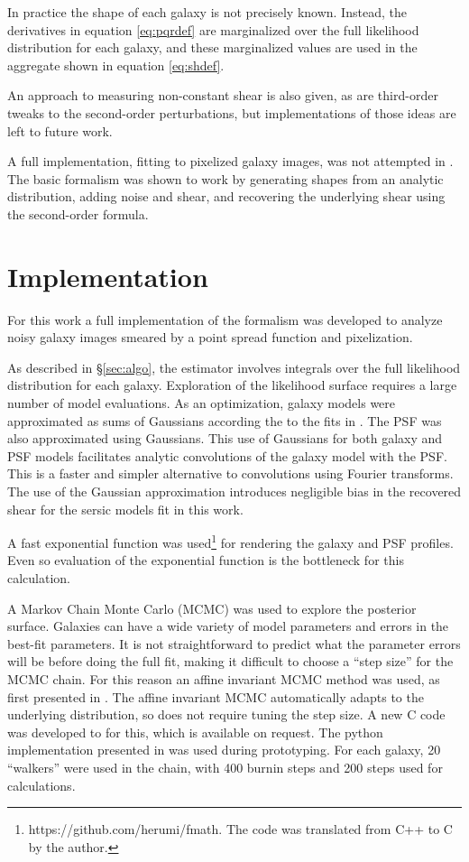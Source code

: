 \documentclass[12pt,preprint]{aastex}
\begin{document}
In practice the shape of each galaxy is not precisely known. Instead, the
derivatives in equation \ref{eq:pqrdef} are marginalized over the full
likelihood distribution for each galaxy, and these marginalized values are used
in the aggregate shown in equation \ref{eq:shdef}.  

An approach to measuring non-constant shear is also given, as are third-order
tweaks to the second-order perturbations, but implementations of those ideas
are left to future work.

A full implementation, fitting to pixelized galaxy images, was not attempted in
\citet{ba13}.  The basic formalism was shown to work by generating shapes from
an analytic distribution, adding noise and shear, and recovering the underlying
shear using the second-order formula.

\section{Implementation} \label{sec:impl}

For this work a full implementation of the \citet{ba13} formalism was developed
to analyze noisy galaxy images smeared by a point spread function and 
pixelization.

As described in \S \ref{sec:algo}, the estimator involves integrals over the
full likelihood distribution for each galaxy.  Exploration of the likelihood
surface requires a large number of model evaluations.  As an optimization,
galaxy models were approximated as sums of Gaussians according the to the fits
in \citet{HoggGMix12}.  The PSF was also approximated using Gaussians.  This
use of Gaussians for both galaxy and PSF models facilitates analytic
convolutions of the galaxy model with the PSF.  This is a faster and simpler
alternative to convolutions using Fourier transforms. The use of the
Gaussian approximation introduces negligible bias in the recovered shear for
the sersic models fit in this work.

A fast exponential function was used\footnote{https://github.com/herumi/fmath.
The code was translated from C++ to C by the author.} for rendering the galaxy
and PSF profiles.  Even so evaluation of the exponential function is the
bottleneck for this calculation.

A Markov Chain Monte Carlo (MCMC) was used to explore the posterior surface.
Galaxies can have a wide variety of model parameters and errors in the best-fit
parameters.  It is not straightforward to predict what the parameter errors
will be before doing the full fit, making it difficult to choose a ``step
size'' for the MCMC chain.  For this reason an affine invariant MCMC method was
used, as first presented in \citet{GoodmanWeare10}.  The affine invariant MCMC
automatically adapts to the underlying distribution, so does not require tuning
the step size.  A new C code was developed to for this, which is available on
request. The python implementation presented in \citet{Mackey13} was used
during prototyping.  For each galaxy, 20 ``walkers'' were used in the chain,
with 400 burnin steps and 200 steps used for calculations.
\end{document}
